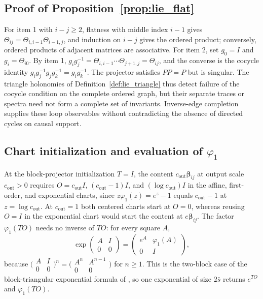 \documentclass[twoside,11pt]{article}
\begin{document}
\subsection{Proof of Proposition~\ref{prop:lie_flat}}
\label{app:proof_lie_flat}

For item 1 with $i-j\ge2$, flatness with middle index $i-1$ gives $\Theta_{ij}=\Theta_{i,i-1}\Theta_{i-1,j}$, and induction on $i-j$ gives the ordered product; conversely, ordered products of adjacent matrices are associative. For item 2, set $g_0=I$ and $g_i=\Theta_{i0}$. By item 1, $g_ig_j^{-1}=\Theta_{i,i-1}\cdots\Theta_{j+1,j}=\Theta_{ij}$, and the converse is the cocycle identity $g_ig_j^{-1}g_jg_k^{-1}=g_ig_k^{-1}$. The projector satisfies $PP=P$ but is singular. The triangle holonomies of Definition~\ref{def:lie_triangle} thus detect failure of the cocycle condition on the complete ordered graph, but their separate traces or spectra need not form a complete set of invariants. Inverse-edge completion supplies these loop observables without contradicting the absence of directed cycles on causal support.

\subsection{Chart initialization and evaluation of \texorpdfstring{$\varphi_1$}{phi1}}
\label{app:chart_initialization}

At the block-projector initialization $T=I$, the content $c_{\mathrm{out}}\boldsymbol\beta_{ij}$ at output scale $c_{\mathrm{out}}>0$ requires $O=c_{\mathrm{out}}I$, $(c_{\mathrm{out}}-1)I$, and $(\log c_{\mathrm{out}})I$ in the affine, first-order, and exponential charts, since $z\varphi_1(z)=e^z-1$ equals $c_{\mathrm{out}}-1$ at $z=\log c_{\mathrm{out}}$. At $c_{\mathrm{out}}=1$ both centered charts start at $O=0$, whereas reusing $O=I$ in the exponential chart would start the content at $e\boldsymbol\beta_{ij}$. The factor $\varphi_1(TO)$ needs no inverse of $TO$: for every square $A$,
\begin{equation}
\exp\begin{pmatrix}A&I\\0&0\end{pmatrix}=\begin{pmatrix}e^{A}&\varphi_1(A)\\0&I\end{pmatrix},
\label{eq:lie_augmented}
\end{equation}
because $\bigl(\begin{smallmatrix}A&I\\0&0\end{smallmatrix}\bigr)^n=\bigl(\begin{smallmatrix}A^n&A^{n-1}\\0&0\end{smallmatrix}\bigr)$ for $n\ge1$. This is the two-block case of the block-triangular exponential formula of \citet{VanLoan1978}, so one exponential of size $2\bar s$ returns $e^{TO}$ and $\varphi_1(TO)$.
\end{document}

